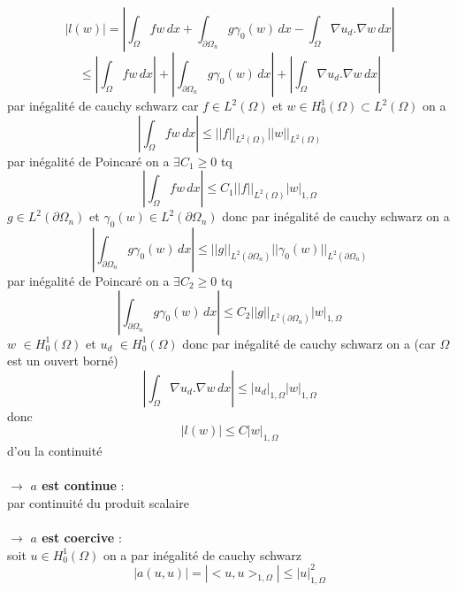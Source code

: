 \documentclass{article}
\begin{document}
$$
|l(w)| = |\int_{\Omega} f w \,dx + \int_{\partial \Omega_{n}} g \gamma_{0}(w) \,dx - \int_{\Omega} \nabla u_d . \nabla w \,dx|
$$
$$
\leq |\int_{\Omega} f w \,dx| + |\int_{\partial \Omega_{n}} g \gamma_{0}(w) \,dx| + |\int_{\Omega} \nabla u_d . \nabla w \,dx|
$$
par inégalité de cauchy schwarz car $f \in L^2(\Omega)$ et $w \in H_{0}^{1}(\Omega) \subset L^2(\Omega)$ on a
$$
|\int_{\Omega} f w \,dx| \leq ||f||_{L^2(\Omega)} ||w||_{L^2(\Omega)} 
$$
par inégalité de Poincaré on a $\exists C_1 \geq 0$ tq
$$
|\int_{\Omega} f w \,dx| \leq C_1 ||f||_{L^2(\Omega)} |w|_{1, \Omega} 
$$
$g \in L^2(\partial \Omega_n)$ et $\gamma_{0}(w) \in L^2(\partial \Omega_n)$ donc par inégalité de cauchy schwarz on a
$$
|\int_{\partial \Omega_{n}} g \gamma_{0}(w) \,dx| \leq ||g||_{L^2(\partial \Omega_n)} ||\gamma_{0}(w)||_{L^2(\partial \Omega_n)}
$$
par inégalité de Poincaré on a $\exists C_2 \geq 0$ tq
$$
|\int_{\partial \Omega_{n}} g \gamma_{0}(w) \,dx| \leq C_2 ||g||_{L^2(\partial \Omega_n)} |w|_{1, \Omega}
$$
$w$ $\in H_{0}^{1}(\Omega)$ et $u_d$ $\in H_{0}^{1}(\Omega)$ donc par inégalité de cauchy schwarz on a (car $\Omega$ est un ouvert borné)
$$
|\int_{\Omega} \nabla u_d . \nabla w \,dx| \leq |u_d|_{1, \Omega} |w|_{1, \Omega}
$$
donc 
$$
|l(w)| \leq C |w|_{1, \Omega}
$$
d'ou la continuité \\ \\
$\rightarrow$ \textbf{$a$ est continue} : \\
par continuité du produit scalaire \\ \\
$\rightarrow$ \textbf{$a$ est coercive} : \\
soit $u \in H_{0}^{1}(\Omega)$ on a par inégalité de cauchy schwarz
$$
|a(u, u)| = |<u, u>_{1, \Omega}| \leq |u|^{2}_{1, \Omega}
$$
\end{document}
